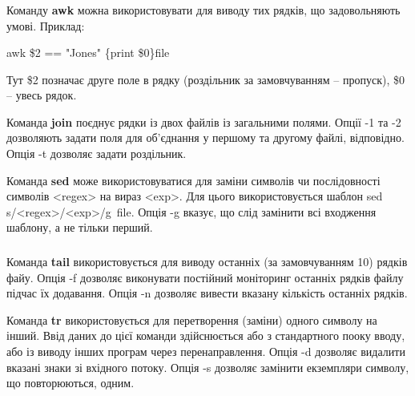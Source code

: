 \documentclass[t]{beamer}  %
\begin{document}
\begin{frame}
	\frametitle{\insertsection} 
	\framesubtitle{\insertsubsection}
Команду \textbf{awk} можна використовувати для виводу тих рядків, що задовольняють умові. Приклад:	

awk \textquotesingle\$2 == "Jones" \{print \$0\}\textquotesingle file

Тут \$2 позначає друге поле в рядку (роздільник за замовчуванням -- пропуск), \$0 -- увесь рядок.

Команда \textbf{join} поєднує рядки із двох файлів із загальними полями. Опції -1 та -2 дозволяють задати поля для об'єднання у першому та другому файлі, відповідно. Опція -t дозволяє задати роздільник.

Команда \textbf{sed} може використовуватися для заміни символів чи послідовності символів <regex> на вираз <exp>. Для цього використовується шаблон sed \textquotesingle s/<regex>/<exp>/g\textquotesingle~file. Опція -g вказує, що слід замінити всі входження шаблону, а не тільки перший.
\end{frame}			

\begin{frame}
	\frametitle{\insertsection} 
	\framesubtitle{\insertsubsection}	
Команда \textbf{tail} використовується для виводу останніх (за замовчуванням 10) рядків файу. Опція -f дозволяє виконувати постійний моніторинг останніх рядків файлу підчас їх додавання. Опція -n дозволяє вивести вказану кількість останніх рядків.

Команда \textbf{tr} використовується для перетворення (заміни) одного символу на інший. Ввід даних до цієї команди здійснюється або з стандартного пооку вводу, або із виводу інших програм через перенаправлення. Опція -d дозволяє видалити вказані знаки зі вхідного потоку. Опція -s дозволяє замінити екземпляри символу, що повторюються, одним.	
\end{frame}
\end{document}
